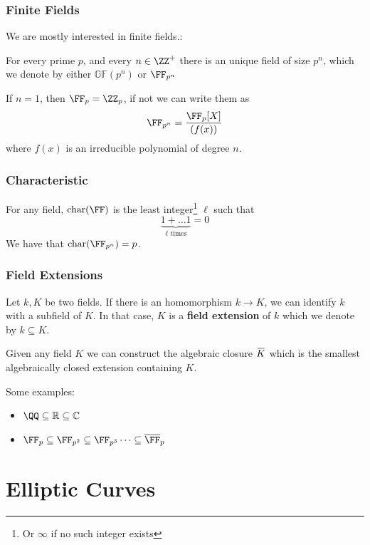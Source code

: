 \documentclass{beamer}
\newcommand{\overbar}[1]{\mkern 1.5mu\overline{\mkern-1.5mu#1\mkern-1.5mu}\mkern 1.5mu}
\begin{document}
\begin{frame}
    \frametitle{Finite Fields}
    We are mostly interested in finite fields.:
    \begin{theorem}
        For every prime $p$, and every $n \in \ZZ^+$ there is an unique field of size $p^n$, which we denote 
        by either $\mathbb{GF}(p^n)$ or $\FF_{p^n}$
    \end{theorem}
    \pause
    
    If $n = 1$, then $\FF_{p} = \ZZ_p$, if not we can write them as
    \[ \FF_{p^n} = \frac{\FF_{p}[X]}{(f(x))} \]
    where $f(x)$ is an irreducible polynomial of degree $n$.
\end{frame}

\begin{frame}
    \frametitle{Characteristic}
    For any field, $\mathrm{char}(\FF)$ is the least integer\footnote{Or $\infty$ if no such integer exists} $\ell$ such that 
    \[ \underbrace{1 + \dots 1}_{\ell \text{ times}} = 0 \]
    We have that $\mathrm{char}(\FF_{p^n}) = p$. 
\end{frame}

\begin{frame}
    \frametitle{Field Extensions}
    Let $k, K$ be two fields. If there is an homomorphism $k \to K$, we can identify $k$ with a subfield of $K$. 
    In that case, $K$ is a \textbf{field extension} of $k$ which we denote by $k \subseteq K$. 
    
    \pause
    Given any field $K$ we can construct the algebraic closure $\overbar{K}$ which is the smallest algebraically closed extension containing $K$.

    Some examples:
    \begin{itemize}
        \item<1-> $\QQ \subseteq \mathbb{R} \subseteq \mathbb{C}$
        \item<2-> $\FF_p \subseteq \FF_{p^2} \subseteq \FF_{p^3} \dots \subseteq \overline{\FF}_{p}$
    \end{itemize}
\end{frame}

\section{Elliptic Curves}
\end{document}
